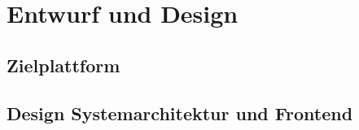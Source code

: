 \section{Entwurf und Design}\label{sec:entwurf-und-design}

\subsection{Zielplattform}\label{subsec:zielplattform}

\subsection{Design Systemarchitektur und Frontend}\label{subsec:design-systemarchitektur-und-frontend}